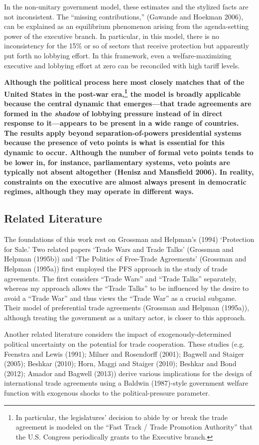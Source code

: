 \documentclass[10pt]{article}
\begin{document}
In the non-unitary government model, these estimates and the stylized facts are not inconsistent. The ``missing contributions,'' (Gawande and Hoekman 2006), can be explained as an equilibrium phenomenon arising from the agenda-setting power of the executive branch. In particular, in this model, there is no inconsistency for the 15$\%$ or so of sectors that receive protection but apparently put forth no lobbying effort. In this framework, even a welfare-maximizing executive and lobbying effort at zero can be reconciled with high tariff levels.

\textbf{Although the political process here most closely matches that of the United States in the post-war era,\footnote{In particular, the legislatures' decision to abide by or break the trade agreement is modeled on the ``Fast Track / Trade Promotion Authority'' that the U.S. Congress periodically grants to the Executive branch.} the model is broadly applicable because the central dynamic that emerges---that trade agreements are formed in the \textit{shadow} of lobbying pressure instead of in direct response to it---appears to be present in a wide range of countries. The results apply beyond separation-of-powers presidential systems because the presence of veto points is what is essential for this dynamic to occur. Although the number of formal veto points tends to be lower in, for instance, parliamentary systems, veto points are typically not absent altogether (Henisz and Mansfield 2006). In reality, constraints on the executive are almost always present in democratic regimes, although they may operate in different ways.}


\subsection{Related Literature}
The foundations of this work rest on Grossman and Helpman's (1994) `Protection for Sale.' Two related papers `Trade Wars and Trade Talks' (Grossman and Helpman (1995b)) and `The Politics of Free-Trade Agreements' (Grossman and Helpman (1995a)) first employed the PFS approach in the study of trade agreements. The first considers ``Trade Wars'' and ``Trade Talks'' separately, whereas my approach allows the ``Trade Talks'' to be influenced by the desire to avoid a ``Trade War'' and thus views the ``Trade War'' as a crucial subgame. Their model of preferential trade agreements (Grossman and Helpman (1995a)), although treating the government as a unitary actor, is closer to this approach.

Another related literature considers the impact of exogenously-determined political uncertainty on the potential for trade cooperation. These studies (e.g. Feenstra and Lewis (1991); Milner and Rosendorff (2001); Bagwell and Staiger (2005); Beshkar (2010); Horn, Maggi and Staiger (2010); Beshkar and Bond (2012); Amador and Bagwell (2013)) derive various implications for the design of international trade agreements using a Baldwin (1987)-style government welfare function with exogenous shocks to the political-pressure parameter. 
\end{document}
